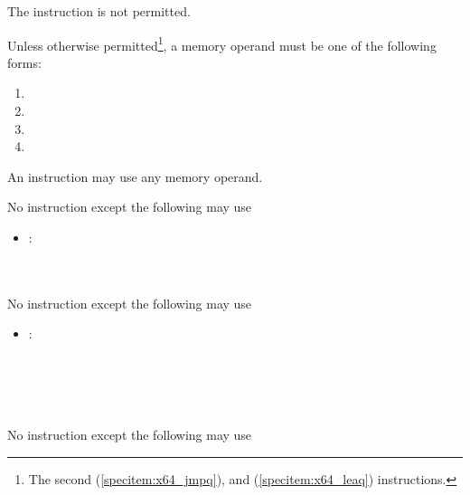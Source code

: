 
\specitem
The  instruction is not permitted.


\specitem
Unless otherwise permitted\footnote{The second   (\ref{specitem:x64_jmpq}), and  (\ref{specitem:x64_leaq}) instructions.}, a memory operand must be one of the following forms:

\begin{enumerate}
    \item {}
    \item {}
    \item {}
    \item {}
\end{enumerate}

\specitem
\label{specitem:x64_leaq}
An  instruction may use any memory operand.

\specitem
No instruction except the following may use 

\begin{itemize}
    \item
        : \\
         \\
         \\
\end{itemize}

\specitem
No instruction except the following may use 

\begin{itemize}
    \item
        : \\
         \\
         \\
         \\
         \\
\end{itemize}

\specitem
No instruction except the following may use 

